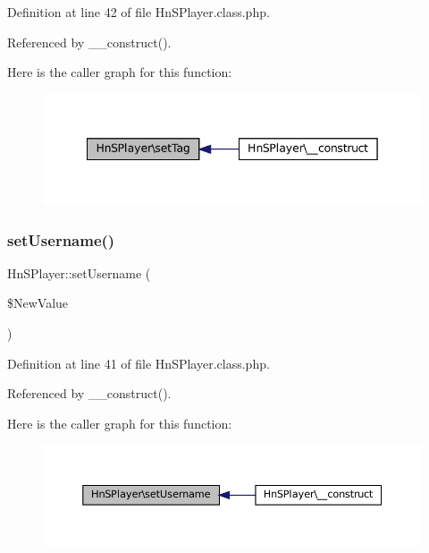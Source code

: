 Definition at line 42 of file Hn\+S\+Player.\+class.\+php.



Referenced by \+\_\+\+\_\+construct().

Here is the caller graph for this function\+:\nopagebreak
\begin{figure}[H]
\begin{center}
\leavevmode
\includegraphics[width=342pt]{class_hn_s_player_ae89a8821f5115eedc4b3d576c797d78e_icgraph}
\end{center}
\end{figure}
\mbox{\label{class_hn_s_player_a431a710c7491d53ad935773288376767}} 
\subsubsection{\texorpdfstring{set\+Username()}{setUsername()}}
{\footnotesize\ttfamily Hn\+S\+Player\+::set\+Username (\begin{DoxyParamCaption}\item[{}]{\$\+New\+Value }\end{DoxyParamCaption})}



Definition at line 41 of file Hn\+S\+Player.\+class.\+php.



Referenced by \+\_\+\+\_\+construct().

Here is the caller graph for this function\+:\nopagebreak
\begin{figure}[H]
\begin{center}
\leavevmode
\includegraphics[width=350pt]{class_hn_s_player_a431a710c7491d53ad935773288376767_icgraph}
\end{center}
\end{figure}


